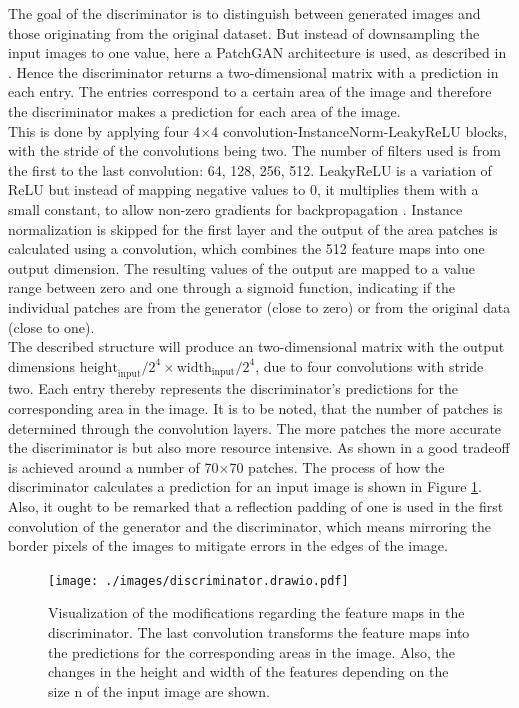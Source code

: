 The goal of the discriminator is to distinguish between generated images and those originating from the original dataset.
But instead of downsampling the input images to one value, here a PatchGAN architecture is used, as described in \cite{Isola2016}.
Hence the discriminator returns a two-dimensional matrix with a prediction in each entry.
The entries correspond to a certain area of the image and therefore the discriminator makes a prediction for each area of the image.\\
This is done by applying four 4$\times$4 convolution-InstanceNorm-LeakyReLU blocks, with the stride of the convolutions being two.
The number of filters used is from the first to the last convolution: 64, 128, 256, 512.
LeakyReLU is a variation of ReLU but instead of mapping negative values to 0, it multiplies them with a small constant, to allow non-zero gradients for backpropagation \cite{Sharma2020}.
Instance normalization is skipped for the first layer and the output of the area patches is calculated using a convolution, which combines the 512 feature maps into one output dimension.
The resulting values of the output are mapped to a value range between zero and one through a sigmoid function, indicating if the individual patches are from the generator (close to zero) or from the original data (close to one).\\
The described structure will produce an two-dimensional matrix with the output dimensions $\text{height}_{\text{input}}/2^4 \times \text{width}_{\text{input}}/2^4$, due to four convolutions with stride two.
Each entry thereby represents the discriminator's predictions for the corresponding area in the image.
It is to be noted, that the number of patches is determined through the convolution layers.
The more patches the more accurate the discriminator is but also more resource intensive.
As shown in \cite{isola2017image} a good tradeoff is achieved around a number of 70$\times$70 patches.
The process of how the discriminator calculates a prediction for an input image is shown in Figure \ref{cycle_disc_fig}.
Also, it ought to be remarked that a reflection padding of one is used in the first convolution of the generator and the discriminator, which means mirroring the border pixels of the images to mitigate errors in the edges of the image.\\
\begin{figure}[bt]
    \begin{center}
     \texttt{[image: ./images/discriminator.drawio.pdf]}
    \caption[CycleGAN discriminator.]{{Visualization of the modifications regarding the feature maps in the discriminator.
        The last convolution transforms the feature maps into the predictions for the corresponding areas in the image.
        Also, the changes in the height and width of the features depending on the size n of the input image are shown.
    }\label{cycle_disc_fig}}
    \end{center}
\end{figure}
